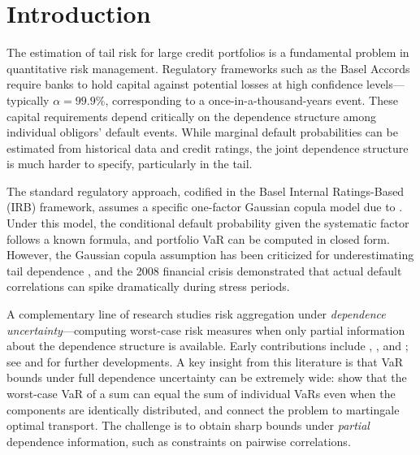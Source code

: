 \documentclass[11pt]{article}
\theoremstyle{definition}
\newcommand{\1}{\mathbf{1}}
\begin{document}
\section{Introduction}\label{sec:intro}

The estimation of tail risk for large credit portfolios is a fundamental problem in quantitative risk management. Regulatory frameworks such as the Basel Accords require banks to hold capital against potential losses at high confidence levels---typically $\alpha = 99.9\%$, corresponding to a once-in-a-thousand-years event. These capital requirements depend critically on the dependence structure among individual obligors' default events. While marginal default probabilities can be estimated from historical data and credit ratings, the joint dependence structure is much harder to specify, particularly in the tail.

The standard regulatory approach, codified in the Basel Internal Ratings-Based (IRB) framework, assumes a specific one-factor Gaussian copula model due to \citet{Vasicek2002}. Under this model, the conditional default probability given the systematic factor follows a known formula, and portfolio VaR can be computed in closed form. However, the Gaussian copula assumption has been criticized for underestimating tail dependence \citep{EmbrechtsEtAl2002, McNeilEtAl2015}, and the 2008 financial crisis demonstrated that actual default correlations can spike dramatically during stress periods.

A complementary line of research studies risk aggregation under \emph{dependence uncertainty}---computing worst-case risk measures when only partial information about the dependence structure is available. Early contributions include \citet{Makarov1981}, \citet{Ruschendorf1982}, and \citet{EmbrechtsEtAl2013}; see \citet{BernardEtAl2014} and \citet{WangEtAl2013} for further developments. A key insight from this literature is that VaR bounds under full dependence uncertainty can be extremely wide: \citet{EmbrechtsEtAl2006} show that the worst-case VaR of a sum can equal the sum of individual VaRs even when the components are identically distributed, and \citet{BeiglbockJuillet2016} connect the problem to martingale optimal transport. The challenge is to obtain sharp bounds under \emph{partial} dependence information, such as constraints on pairwise correlations.
\end{document}
